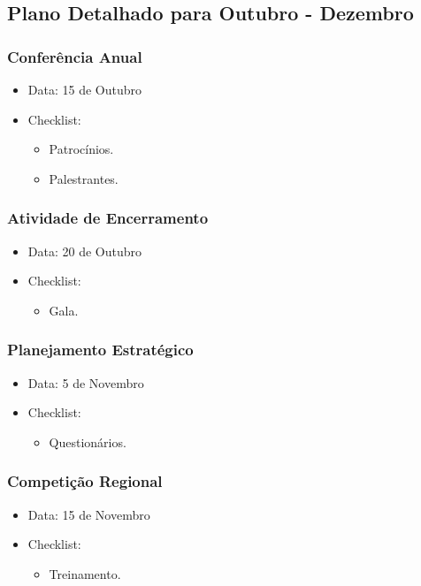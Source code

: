 \documentclass[12pt]{article}
\begin{document}
\subsection{Plano Detalhado para Outubro - Dezembro}

\subsubsection{Conferência Anual}
\begin{itemize}
    \item Data: 15 de Outubro
    \item Checklist:
      \begin{itemize}
        \item Patrocínios.
        \item Palestrantes.
      \end{itemize}
\end{itemize}

\subsubsection{Atividade de Encerramento}
\begin{itemize}
    \item Data: 20 de Outubro
    \item Checklist:
      \begin{itemize}
        \item Gala.
      \end{itemize}
\end{itemize}

\subsubsection{Planejamento Estratégico}
\begin{itemize}
    \item Data: 5 de Novembro
    \item Checklist:
      \begin{itemize}
        \item Questionários.
      \end{itemize}
\end{itemize}

\subsubsection{Competição Regional}
\begin{itemize}
    \item Data: 15 de Novembro
    \item Checklist:
      \begin{itemize}
        \item Treinamento.
      \end{itemize}
\end{itemize}
\end{document}
